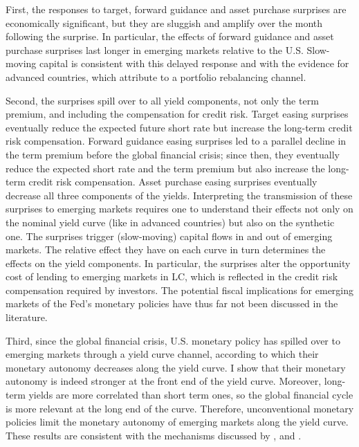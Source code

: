 {First, the responses to target, forward guidance and asset purchase surprises are economically significant, but they are sluggish and amplify over the month following the surprise. In particular, the effects of forward guidance and asset purchase surprises last longer in emerging markets relative to the U.S. Slow-moving capital is consistent with this delayed response and with the evidence for advanced countries, which \cite{BrooksKatzLustig:2019} attribute to a portfolio rebalancing channel.

Second, the surprises spill over to all yield components, not only the term premium, and including the compensation for credit risk. Target easing surprises eventually reduce the expected future short rate but increase the long-term credit risk compensation. Forward guidance easing surprises led to a parallel decline in the term premium before the global financial crisis; since then, they eventually reduce the expected short rate and the term premium but also increase the long-term credit risk compensation. Asset purchase easing surprises eventually decrease all three components of the yields. Interpreting the transmission of these surprises to emerging markets requires one to understand their effects not only on the nominal yield curve (like in advanced countries) but also on the synthetic one. The surprises trigger (slow-moving) capital flows in and out of emerging markets. The relative effect they have on each curve in turn determines the effects on the yield components. In particular, the surprises alter the opportunity cost of lending to emerging markets in LC, which is reflected in the credit risk compensation required by investors. The potential fiscal implications for emerging markets of the Fed's monetary policies have thus far not been discussed in the literature.

Third, since the global financial crisis, U.S. monetary policy has spilled over to emerging markets through a yield curve channel, according to which their monetary autonomy decreases along the yield curve. I show that their monetary autonomy is indeed stronger at the front end of the yield curve. Moreover, long-term yields are more correlated than short term ones, so the global financial cycle is more relevant at the long end of the curve. Therefore, unconventional monetary policies limit the monetary autonomy of emerging markets along the yield curve. These results are consistent with the mechanisms discussed by \cite{Obstfeld:2015}, \cite{Kalemli-Ozcan:2019} and \cite{KolasaWesolowski:2020}.

}
